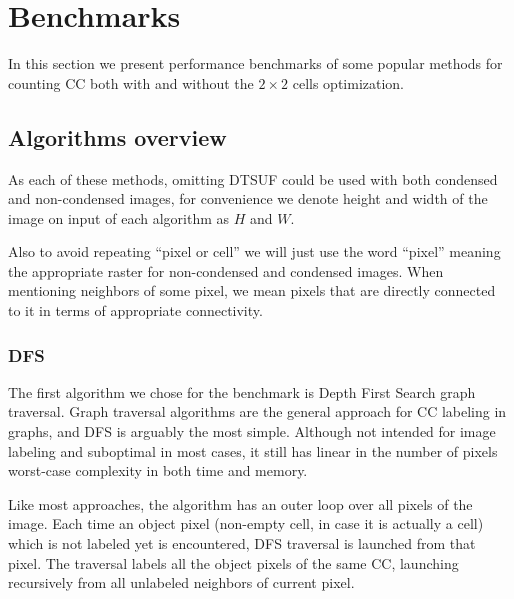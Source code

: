 \documentclass[hidelinks]{llncs}
\newcommand{\texten}[1]{#1}
\newcommand{\textru}[1]{}
\begin{document}
\section{Benchmarks}

In this section we present performance benchmarks of some popular methods for
counting CC both with and without the $2 \times 2$ cells optimization.

\subsection{Algorithms overview}

\texten{
As each of these methods, omitting DTSUF could be used with both condensed and
non-condensed images, for convenience we denote height and width of the image
on input of each algorithm as $H$ and $W$.
}\textru{
Так как все рассматриваемые методы, кроме DTSUF, можно применять как для
сжатого, так и для несжатого изображения, мы обозначим размеры входного
изображения каждого изображения за $H$ и $W$.
}

\texten{
Also to avoid repeating ``pixel or cell'' we will just use the word ``pixel''
meaning the appropriate raster for non-condensed and condensed images. When
mentioning neighbors of some pixel, we mean pixels that are directly connected
to it in terms of appropriate connectivity.
}\textru{
По аналогии, чтобы избежать повторения ``пиксель или клетка'' мы будет просто
использовать слово ``пиксель'', имея в виду растр входного изображения.
Под соседями пикселя будем понимать пиксели, прямо связанные с ним в терминах
соответствующей связности.
}

\subsubsection{DFS}

The first algorithm we chose for the benchmark is Depth First Search graph
traversal. Graph traversal algorithms are the general approach for CC labeling
in graphs, and DFS is arguably the most simple.
Although not intended for image labeling and suboptimal in most cases, it still
has linear in the number of pixels worst-case complexity in both time and
memory.

Like most approaches, the algorithm has an outer loop over all pixels of the
image. Each time an object pixel (non-empty cell, in case it is actually a cell)
which is not labeled yet is encountered, DFS traversal is launched from that
pixel. The traversal labels all the object pixels of the same CC, launching
recursively from all unlabeled neighbors of current pixel.
\end{document}
